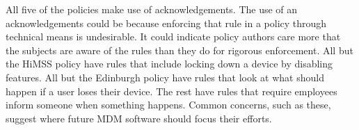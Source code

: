 \documentclass{llncs}
\newenvironment{policyrule}[1]{%
  \begin{mdframed}[]\footnotesize
      \noindent\textbf{\sffamily #1}:~\itshape%
}{%
  \end{mdframed}
}
\begin{document}

All five of the policies make use of acknowledgements.
The use of an acknowledgements could be because enforcing that rule in a policy through technical means is undesirable. 
It could indicate policy authors care more that the subjects are aware of the rules than they do for rigorous enforcement.
All but the \ac{HiMSS} policy have rules that include locking down a device by disabling features.
All but the Edinburgh policy have rules that look at what should happen if a user loses their device.
The rest have rules that require employees inform someone when something happens.
Common concerns, such as these, suggest where future \ac{MDM} software should focus their efforts.
\end{document}
